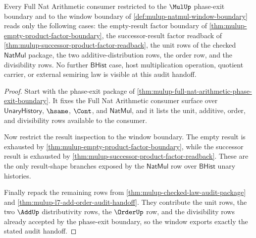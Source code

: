 \begin{theorem}
\label{thm:mulup-natmul-window-exhaustion}
Every Full Nat Arithmetic consumer restricted to the $\MulUp$ phase-exit
boundary and to the window boundary of
\autoref{def:mulup-natmul-window-boundary} reads only the following
cases: the empty-result factor boundary of
\autoref{thm:mulup-empty-product-factor-boundary}, the successor-result
factor readback of
\autoref{thm:mulup-successor-product-factor-readback}, the unit rows of
the checked $\mathsf{NatMul}$ package, the two additive-distribution
rows, the order row, and the divisibility rows. No further
$\mathsf{BHist}$ case, host multiplication operation, quotient carrier,
or external semiring law is visible at this audit handoff.
\end{theorem}
\begin{proof}
Start with the phase-exit package of
\autoref{thm:mulup-full-nat-arithmetic-phase-exit-boundary}. It fixes the
Full Nat Arithmetic consumer surface over $\mathsf{UnaryHistory}$,
$\hsame$, $\Cont$, and $\mathsf{NatMul}$, and it lists the unit,
additive, order, and divisibility rows available to the consumer.

Now restrict the result inspection to the window boundary. The empty
result is exhausted by
\autoref{thm:mulup-empty-product-factor-boundary}, while the successor
result is exhausted by
\autoref{thm:mulup-successor-product-factor-readback}. These are the only
result-shape branches exposed by the $\mathsf{NatMul}$ row over
$\mathsf{BHist}$ unary histories.

Finally repack the remaining rows from
\autoref{thm:mulup-checked-law-audit-package} and
\autoref{thm:mulup-l7-add-order-audit-handoff}. They contribute the unit
rows, the two $\AddUp$ distributivity rows, the $\OrderUp$ row, and the
divisibility rows already accepted by the phase-exit boundary, so the
window exports exactly the stated audit handoff.
\end{proof}
